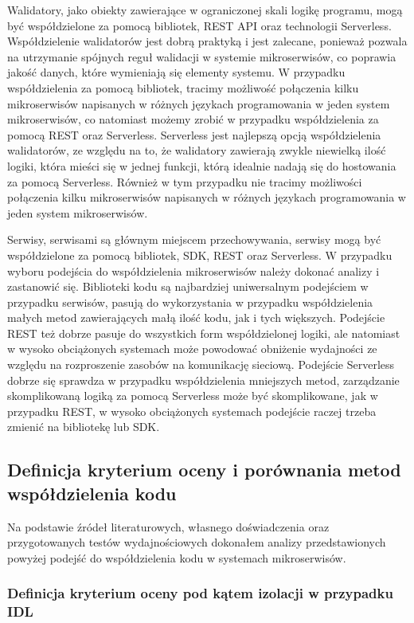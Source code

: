 \documentclass[runningheads,12pt]{llncs}
\begin{document}
Walidatory, jako obiekty zawierające w ograniczonej skali logikę programu, mogą być współdzielone za pomocą bibliotek, REST API oraz technologii Serverless. Współdzielenie walidatorów jest dobrą praktyką i jest zalecane, ponieważ pozwala na utrzymanie spójnych reguł walidacji w systemie mikroserwisów, co poprawia jakość danych, które wymieniają się elementy systemu. W przypadku współdzielenia za pomocą bibliotek, tracimy możliwość połączenia kilku mikroserwisów napisanych w różnych językach programowania w jeden system mikroserwisów, co natomiast możemy zrobić w przypadku współdzielenia za pomocą REST oraz Serverless. Serverless jest najlepszą opcją współdzielenia walidatorów, ze względu na to, że walidatory zawierają zwykle niewielką ilość logiki, która mieści się w jednej funkcji, którą idealnie nadają się do hostowania za pomocą Serverless. Również w tym przypadku nie tracimy możliwości połączenia kilku mikroserwisów napisanych w różnych językach programowania w jeden system mikroserwisów.

Serwisy, serwisami są głównym miejscem przechowywania, serwisy mogą być współdzielone za pomocą bibliotek, SDK, REST oraz Serverless. W przypadku wyboru podejścia do współdzielenia mikroserwisów należy dokonać analizy i zastanowić się. Biblioteki kodu są najbardziej uniwersalnym podejściem w przypadku serwisów, pasują do wykorzystania w przypadku współdzielenia małych metod zawierających małą ilość kodu, jak i tych większych. Podejście REST też dobrze pasuje do wszystkich form współdzielonej logiki, ale natomiast w wysoko obciążonych systemach może powodować obniżenie wydajności ze względu na rozproszenie zasobów na komunikację sieciową. Podejście Serverless dobrze się sprawdza w przypadku współdzielenia mniejszych metod, zarządzanie skomplikowaną logiką za pomocą Serverless może być skomplikowane, jak w przypadku REST, w wysoko obciążonych systemach podejście raczej trzeba zmienić na bibliotekę lub SDK.

\subsection{Definicja kryterium oceny i porównania metod współdzielenia kodu}

Na podstawie źródeł literaturowych, własnego doświadczenia oraz przygotowanych testów wydajnościowych dokonałem analizy przedstawionych powyżej podejść do współdzielenia kodu w systemach mikroserwisów.

\subsubsection{Definicja kryterium oceny pod kątem izolacji w przypadku IDL}
\end{document}

